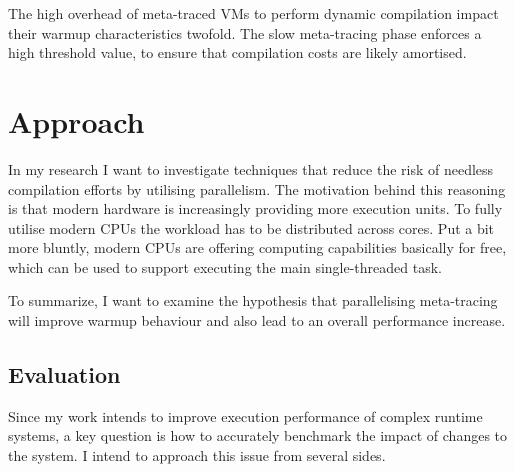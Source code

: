The high overhead of meta-traced VMs to perform dynamic compilation impact their
warmup characteristics twofold. The slow meta-tracing phase enforces a high
threshold value, to ensure that compilation costs are likely amortised.









\section{Approach}

In my research I want to investigate techniques that reduce the risk of needless
compilation efforts by utilising parallelism. The motivation behind this
reasoning is that modern hardware is increasingly providing more execution
units. To fully utilise modern CPUs the workload has to be distributed across
cores. Put a bit more bluntly, modern CPUs are offering computing capabilities
basically for free, which can be used to support executing the main
single-threaded task.

To summarize, I want to examine the hypothesis that parallelising meta-tracing
will improve warmup behaviour and also lead to an overall performance increase.


\subsection{Evaluation}

Since my work intends to improve execution performance of complex runtime
systems, a key question is how to accurately benchmark the impact of changes to
the system. I intend to approach this issue from several sides.

